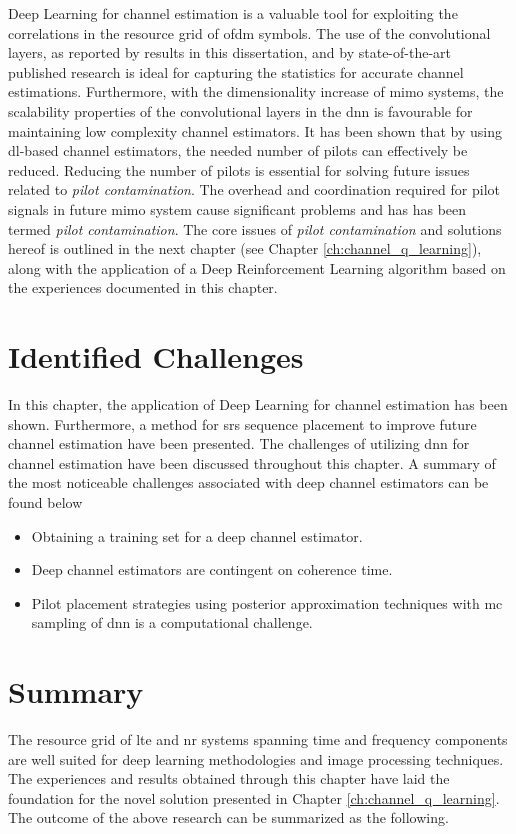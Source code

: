 Deep Learning for channel estimation is a valuable tool for exploiting the correlations in the resource grid of \gls{ofdm} symbols. The use of the convolutional layers, as reported by results in this dissertation, and by state-of-the-art published research is ideal for capturing the statistics for accurate channel estimations. Furthermore, with the dimensionality increase of \gls{mimo} systems, the scalability properties of the convolutional layers in the \gls{dnn} is favourable for maintaining low complexity channel estimators. It has been shown that by using \gls{dl}-based channel estimators, the needed number of pilots can effectively be reduced. Reducing the number of pilots is essential for solving future issues related to \emph{pilot contamination}. The overhead and coordination required for pilot signals in future \gls{mimo} system cause significant problems and has has been termed \emph{pilot contamination}. The core issues of \emph{pilot contamination} and solutions hereof is outlined in the next chapter (see Chapter \ref{ch:channel_q_learning}), along with the application of a Deep Reinforcement Learning algorithm based on the experiences documented in this chapter.

\section{Identified Challenges}\label{sec:channel_estimation_challenges}
In this chapter, the application of Deep Learning for channel estimation has been shown. Furthermore, a method for \gls{srs} sequence placement to improve future channel estimation have been presented. The challenges of utilizing \gls{dnn} for channel estimation have been discussed throughout this chapter. A summary of the most noticeable challenges associated with deep channel estimators can be found below
\begin{itemize}
    \item Obtaining a training set for a deep channel estimator.
    \item Deep channel estimators are contingent on coherence time.
    \item Pilot placement strategies using posterior approximation techniques with \gls{mc} sampling of \gls{dnn} is a computational challenge.
\end{itemize}

\section{Summary}
The resource grid of \gls{lte} and \gls{nr} systems spanning time and frequency components are well suited for deep learning methodologies and image processing techniques. The experiences and results obtained through this chapter have laid the foundation for the novel solution presented in  Chapter \ref{ch:channel_q_learning}. The outcome of the above research can be summarized as the following.

